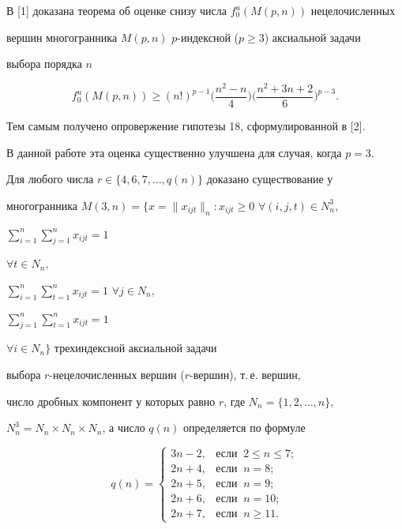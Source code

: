 \label{begin}





В [1] доказана теорема об оценке снизу числа $f^u_0(M(p,n))$ нецелочисленных


вершин многогранника $M(p,n)$\; $p$-индексной ($p\geq 3$) аксиальной задачи


выбора порядка $n$


\begin{equation}


f^u_0(M(p,n))\geq (n!)^{p-1}\bigg(\frac{n^2-n}{4}\bigg)


\bigg(\frac{n^2+3n+2}{6}\bigg)^{p-3}.


\end{equation}


Тем самым получено опровержение гипотезы 18, сформулированной в [2].


В данной работе эта оценка существенно улучшена для случая, когда $p=3$.


Для любого числа $r\in\{4,6,7,\dotsc,q(n)\}$ доказано существование у


многогранника $M(3,n)=\Big\{x=\|x_{ijt}\|_n: x_{ijt}


\geq 0$ $\forall (i,j,t)\in N^3_n$,


$\sum\limits_{i=1}^n\sum\limits_{j=1}^n x_{ijt}=1$


$\forall t\in N_n,$


$\sum\limits_{i=1}^n\sum\limits_{t=1}^n x_{ijt}=1$ $\forall j\in N_n,$


$\sum\limits_{j=1}^n\sum\limits_{t=1}^n x_{ijt}=1$


$\forall i\in N_n\Big\}$ трехиндексной аксиальной задачи


выбора $r$-нецелочисленных вершин ($r$-вершин), т.\,е. вершин,


число дробных компонент у которых равно $r$, где $N_n=\{1,2,\dotsc,n\}$,


$N^3_n=N_n\times N_n\times N_n$, а число $q(n)$ определяется по формуле


\begin{equation} 


q(n)=


\begin{cases}


3n-2,&\text{если }\ 2\leq n\leq 7;\\


2n+4,&\text{если }\ n=8; \\


2n+5,&\text{если }\ n=9; \\


2n+6,&\text{если }\ n=10; \\


2n+7,&\text{если }\ n\geq 11.


\end{cases}


\end{equation}


